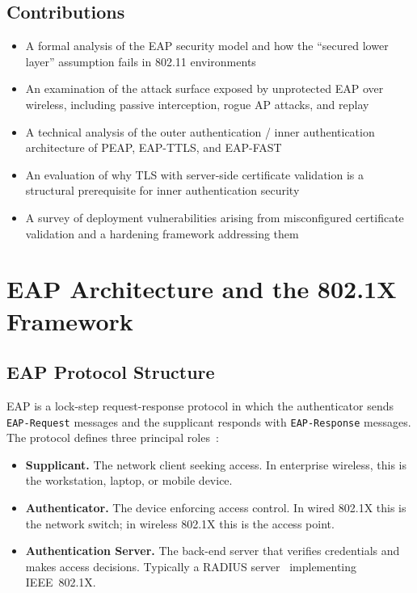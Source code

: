\documentclass[journal]{IEEEtran}
\begin{document}
\subsection{Contributions}

\begin{itemize}
  \item A formal analysis of the EAP security model and how the ``secured lower
        layer'' assumption fails in 802.11 environments
  \item An examination of the attack surface exposed by unprotected EAP over
        wireless, including passive interception, rogue AP attacks, and replay
  \item A technical analysis of the outer authentication / inner authentication
        architecture of PEAP, EAP-TTLS, and EAP-FAST
  \item An evaluation of why TLS with server-side certificate validation is a
        structural prerequisite for inner authentication security
  \item A survey of deployment vulnerabilities arising from misconfigured certificate
        validation and a hardening framework addressing them
\end{itemize}

\section{EAP Architecture and the 802.1X Framework}

\subsection{EAP Protocol Structure}

EAP is a lock-step request-response protocol in which the authenticator sends
\texttt{EAP-Request} messages and the supplicant responds with \texttt{EAP-Response}
messages. The protocol defines three principal roles~\cite{rfc3748}:

\begin{itemize}
  \item \textbf{Supplicant.} The network client seeking access. In enterprise wireless,
        this is the workstation, laptop, or mobile device.
  \item \textbf{Authenticator.} The device enforcing access control. In wired 802.1X
        this is the network switch; in wireless 802.1X this is the access point.
  \item \textbf{Authentication Server.} The back-end server that verifies credentials
        and makes access decisions. Typically a RADIUS server~\cite{rfc2865}
        implementing IEEE~802.1X.
\end{itemize}
\end{document}
